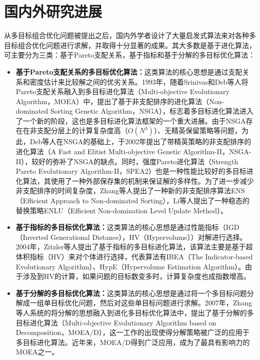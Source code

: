 \section{国内外研究进展}

从多目标组合优化问题被提出之后，国内外学者设计了大量启发式算法来对各种多目标组合优化问题进行求解，并取得十分显著的成果。其大多数是基于进化算法，可主要分为三类：基于Pareto支配关系，基于指标和基于分解的多目标优化算法：
\begin{itemize}
    \item \textbf{基于Pareto支配关系的多目标优化算法：}这类算法的核心思想是通过支配关系和密度估计来比较解之间的优劣关系。1993年，随着Srinivas和Deb等人将Pareto支配关系融入到多目标进化算法（Multi-objective Evolutionary Algorithm，MOEA）中，提出了基于非支配排序的进化算法（Non-dominated Sorting Genetic Algorithm，NSGA）\cite{srinivas1994muiltiobjective}，标志着多目标进化算法进入了一个新的阶段，这也是多目标进化算法框架的一个重大进展。由于NSGA存在在非支配分层上的计算复杂度高（$O(N^3)$）、无精英保留策略等问题，为此，Deb等人在NSGA的基础上，于2002年提出了带精英策略的非支配排序的进化算法（A Fast and Elitist Multi-objective Genetic Algorithm-II，NSGA-II）\cite{deb2002fast}，较好的弥补了NSGA的缺点。同时，强度Pareto进化算法（Strength Pareto Evolutionary Algorithm-II，SPEA2）\cite{zitzler2001spea2}也是一种性能比较好的多目标进化算法，其使用了一种外部保存集的机制来保证解的多样性。为了进一步减少非支配排序的时间复杂度，Zhang等人提出了一种新的非支配排序算法ENS（Efficient Approach to Non-dominated Sorting）\cite{zhang2014efficient}，Li等人提出了一种稳态的替换策略ENLU（Efficient Non-domination Level Update Method）\cite{li2016efficient}。
    \item \textbf{基于指标的多目标优化算法：}这类算法的核心思想是通过性能指标（IGD（Inverted Generational Distance）\cite{bosman2003balance}，HV（Hypervolume）\cite{zitzler1999multiobjective}）对解进行选择。2004年，Zitzler等人提出了基于指标的多目标进化算法，该算法主要是基于超体积指标（HV）来对个体进行选择，代表算法有IBEA（The Indicator-based Evolutionary Algorithm）\cite{zitzler2004indicator}、HypE（Hypervolume Estimation Algorithm）\cite{bader2011hype}。由于涉及到HV的计算，如果问题的目标数变多时，计算复杂度也成指数增高。
    \item \textbf{基于分解的多目标优化算法：}这类算法的核心思想是通过将一个多目标问题分解成一组单目标优化问题，然后对这些单目标问题进行求解。2007年，Zhang等人系统的将分解的思想融入到进化多目标优化算法中，提出了基于分解的多目标进化算法（Multi-objective Evolutionary Algorithm based on Decomposition，MOEA/D）\cite{zhang2007moea}，这一工作的出现使得分解策略被广泛的应用于多目标进化算法。近年来，MOEA/D得到广泛应用，成为了最具有影响力的MOEA之一。
\end{itemize}
